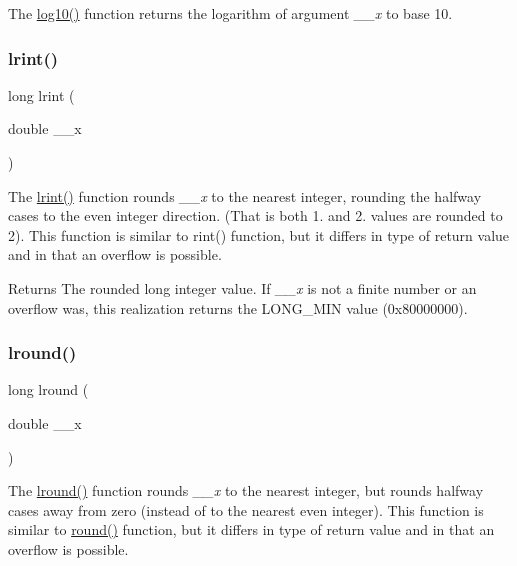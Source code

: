The \hyperlink{group__avr__math_ga89c64ad3ffb4900c806fb6827c30ed1d}{log10()} function returns the logarithm of argument {\itshape \+\_\+\+\_\+x} to base 10. \mbox{\label{group__avr__math_gab6b0c151da73204150528ee81ef45e02}} 
\subsubsection{\texorpdfstring{lrint()}{lrint()}}
{\footnotesize\ttfamily long lrint (\begin{DoxyParamCaption}\item[{double}]{\+\_\+\+\_\+x }\end{DoxyParamCaption})}

The \hyperlink{group__avr__math_gab6b0c151da73204150528ee81ef45e02}{lrint()} function rounds {\itshape \+\_\+\+\_\+x} to the nearest integer, rounding the halfway cases to the even integer direction. (That is both 1. and 2. values are rounded to 2). This function is similar to rint() function, but it differs in type of return value and in that an overflow is possible.

\begin{DoxyReturn}{Returns}
The rounded long integer value. If {\itshape \+\_\+\+\_\+x} is not a finite number or an overflow was, this realization returns the {\ttfamily L\+O\+N\+G\+\_\+\+M\+IN} value (0x80000000). 
\end{DoxyReturn}
\mbox{\label{group__avr__math_gaf3029ef77cd160704ed157c0353cd631}} 
\subsubsection{\texorpdfstring{lround()}{lround()}}
{\footnotesize\ttfamily long lround (\begin{DoxyParamCaption}\item[{double}]{\+\_\+\+\_\+x }\end{DoxyParamCaption})}

The \hyperlink{group__avr__math_gaf3029ef77cd160704ed157c0353cd631}{lround()} function rounds {\itshape \+\_\+\+\_\+x} to the nearest integer, but rounds halfway cases away from zero (instead of to the nearest even integer). This function is similar to \hyperlink{group__avr__math_ga79dbf1906373fcc3bf5edf1ec91674cc}{round()} function, but it differs in type of return value and in that an overflow is possible.

